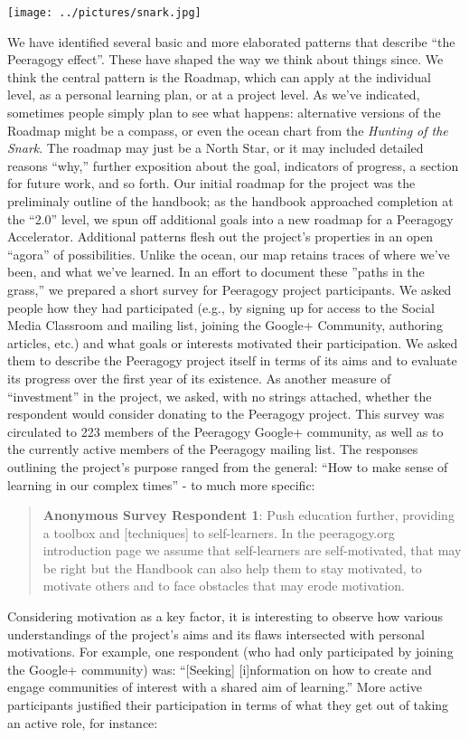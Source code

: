 \texttt{[image: ../pictures/snark.jpg]}

We have identified several basic and more elaborated patterns that
describe ``the Peeragogy effect''. These have shaped the way we think
about things since. We think the central pattern is the Roadmap, which
can apply at the individual level, as a personal learning plan, or at a
project level. As we've indicated, sometimes people simply plan to see
what happens: alternative versions of the Roadmap might be a compass, or
even the ocean chart from the \emph{Hunting of the Snark}. The roadmap
may just be a North Star, or it may included detailed reasons ``why,''
further exposition about the goal, indicators of progress, a section for
future work, and so forth. Our initial roadmap for the project was the
preliminaly outline of the handbook; as the handbook approached
completion at the ``2.0'' level, we spun off additional goals into a new
roadmap for a Peeragogy Accelerator. Additional patterns flesh out the
project's properties in an open ``agora'' of possibilities. Unlike the
ocean, our map retains traces of where we've been, and what we've
learned. In an effort to document these ''paths in the grass,'' we
prepared a short survey for Peeragogy project participants. We asked
people how they had participated (e.g., by signing up for access to the
Social Media Classroom and mailing list, joining the Google+ Community,
authoring articles, etc.) and what goals or interests motivated their
participation. We asked them to describe the Peeragogy project itself in
terms of its aims and to evaluate its progress over the first year of
its existence. As another measure of ``investment'' in the project, we
asked, with no strings attached, whether the respondent would consider
donating to the Peeragogy project. This survey was circulated to 223
members of the Peeragogy Google+ community, as well as to the currently
active members of the Peeragogy mailing list. The responses outlining
the project's purpose ranged from the general: ``How to make sense of
learning in our complex times'' - to much more specific:

\begin{quote}
\textbf{Anonymous Survey Respondent 1}: Push education further,
providing a toolbox and {[}techniques{]} to self-learners. In the
peeragogy.org introduction page we assume that self-learners are
self-motivated, that may be right but the Handbook can also help them to
stay motivated, to motivate others and to face obstacles that may erode
motivation.
\end{quote}
Considering motivation as a key factor, it is interesting to observe how
various understandings of the project's aims and its flaws intersected
with personal motivations. For example, one respondent (who had only
participated by joining the Google+ community) was: ``{[}Seeking{]}
{[}i{]}nformation on how to create and engage communities of interest
with a shared aim of learning.'' More active participants justified
their participation in terms of what they get out of taking an active
role, for instance:

